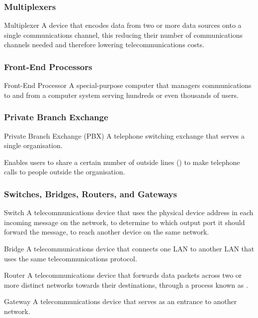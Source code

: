 \documentclass[\main/notes.tex]{subfiles}
\begin{document}
				\subsubsection{Multiplexers}
					\begin{definition}{Multiplexer}
						A device that encodes data from two or more data sources onto a single communications channel, this reducing their number of communications channels needed and therefore lowering telecommunications costs.
					\end{definition}
				\subsubsection{Front-End Processors}
					\begin{definition}{Front-End Processor}
						A special-purpose computer that managers communications to and from a computer system serving hundreds or even thousands of users.
					\end{definition}
				\subsubsection{Private Branch Exchange}
					\begin{definition}{Private Branch Exchange (PBX)}
						A telephone switching exchange that serves a single organisation.

						Enables users to share a certain number of outside lines () to make telephone calls to people outside the organisation.
					\end{definition}
				\subsubsection{Switches, Bridges, Routers, and Gateways}
					\begin{definition}{Switch}
						A telecommunications device that uses the physical device address in each incoming message on the network, to determine to which output port it should forward the message, to reach another device on the same network.
					\end{definition}
					\begin{definition}{Bridge}
						A telecommunications device that connects one LAN to another LAN that uses the same telecommunications protocol.
					\end{definition}
					\begin{definition}{Router}
						A telecommunications device that forwards data packets across two or more distinct networks towards their destinations, through a process known as .
					\end{definition}
					\begin{definition}{Gateway}
						A telecommunications device that serves as an entrance to another network.
					\end{definition}
\end{document}
